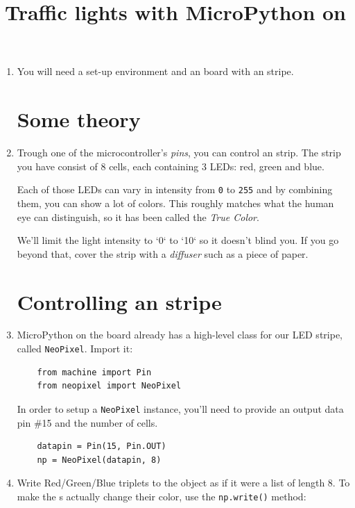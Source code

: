\documentclass{../tutorial}
\title{Traffic lights with MicroPython on \abbr{ESP32}}
\begin{document}
\begin{enumerate}

\item
    You will need a set-up environment and an \ESP board
    with an   stripe.

\section{Some theory}

\item
    Trough one of the microcontroller's \emph{pins},
    you can control an   strip.
    The strip you have consist of 8 cells,
    each containing 3 LEDs: red, green and blue.

    Each of those LEDs can vary in intensity from \lstinline|0| to \lstinline|255|
    and by combining them, you can show a lot of colors.
    This roughly matches what the human eye can distinguish,
    so it has been called the \emph{True Color}.

    We'll limit the light intensity to `0` to `10` so it doesn't blind you.
    If you go beyond that, cover the strip with a \emph{diffuser} such as
    a piece of paper.

\section{Controlling an   stripe}

\item
    MicroPython on the  board already has a high-level class for
    our LED stripe, called \lstinline|NeoPixel|. Import it:

    \begin{lstlisting}
    from machine import Pin
    from neopixel import NeoPixel
    \end{lstlisting}

    In order to setup a \lstinline|NeoPixel| instance,
    you'll need to provide an output data pin \#15 and the number of cells.

    \begin{lstlisting}
    datapin = Pin(15, Pin.OUT)
    np = NeoPixel(datapin, 8)
    \end{lstlisting}

\item
    Write Red/Green/Blue triplets to the object as if it were a list of length 8.
    To make the s actually change their color,
    use the \lstinline|np.write()| method:


\end{enumerate}
\end{document}
